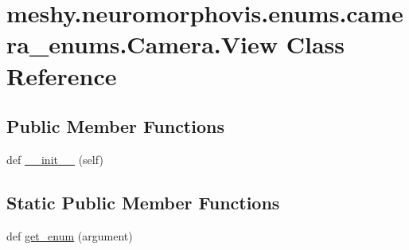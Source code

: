 \hypertarget{classmeshy_1_1neuromorphovis_1_1enums_1_1camera__enums_1_1Camera_1_1View}{}\section{meshy.\+neuromorphovis.\+enums.\+camera\+\_\+enums.\+Camera.\+View Class Reference}
\label{classmeshy_1_1neuromorphovis_1_1enums_1_1camera__enums_1_1Camera_1_1View}


 


\subsection*{Public Member Functions}
\begin{DoxyCompactItemize}
\item 
def \hyperlink{classmeshy_1_1neuromorphovis_1_1enums_1_1camera__enums_1_1Camera_1_1View_a6e2ed7db53184f33a3453fe7896c1568}{\+\_\+\+\_\+init\+\_\+\+\_\+} (self)\hypertarget{classmeshy_1_1neuromorphovis_1_1enums_1_1camera__enums_1_1Camera_1_1View_a6e2ed7db53184f33a3453fe7896c1568}{}\label{classmeshy_1_1neuromorphovis_1_1enums_1_1camera__enums_1_1Camera_1_1View_a6e2ed7db53184f33a3453fe7896c1568}

\end{DoxyCompactItemize}
\subsection*{Static Public Member Functions}
\begin{DoxyCompactItemize}
\item 
def \hyperlink{classmeshy_1_1neuromorphovis_1_1enums_1_1camera__enums_1_1Camera_1_1View_a72a225011340287f8110e3755fd6d14d}{get\+\_\+enum} (argument)
\end{DoxyCompactItemize}
